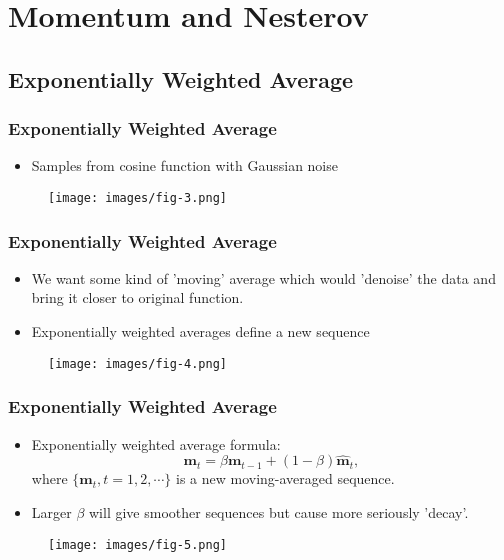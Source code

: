 \documentclass[10pt]{beamer}
\theoremstyle{mystyle}
\def\bb#1{\mathbf{#1}}
\theoremstyle{mystyle}
\begin{document}
\section{Momentum and Nesterov}

\subsection{Exponentially Weighted Average}
\begin{frame}
	\frametitle{Exponentially Weighted Average}
	\begin{itemize}
		\item Samples from cosine function with Gaussian noise
	\end{itemize}
	\begin{figure}[H]
		\centering
		\texttt{[image: images/fig-3.png]}
	\end{figure}
\end{frame}

\begin{frame}
	\frametitle{Exponentially Weighted Average}
	\begin{itemize}
		\item We want some kind of 'moving' average which would 'denoise' the data and bring it closer to original function.
		\item Exponentially weighted averages define a new sequence 
	\end{itemize}
	\begin{figure}[H]
		\centering
		\texttt{[image: images/fig-4.png]}
	\end{figure}
\end{frame}

\begin{frame}
	\frametitle{Exponentially Weighted Average}
	\begin{itemize}
		\item Exponentially weighted average formula:
		\begin{equation}
			\bb m_t = \beta\bb m_{t-1} + (1-\beta)\hat{\bb m}_t,
		\end{equation}
		where $\{\bb m_t, t=1,2,\cdots\}$ is a new moving-averaged sequence. 
		\item Larger $\beta$ will give smoother sequences but cause more seriously 'decay'.
	\end{itemize}
	
	\begin{figure}[H]
		\centering
		\texttt{[image: images/fig-5.png]}
	\end{figure}
\end{frame}
\end{document}
